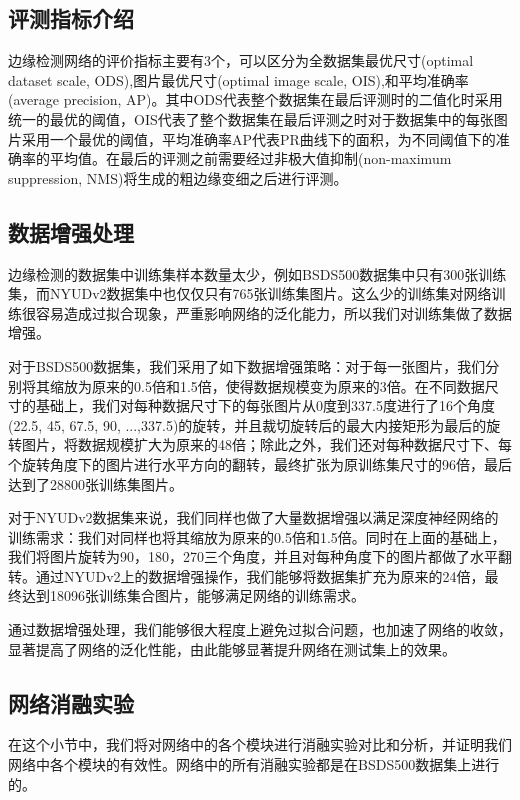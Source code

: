 \documentclass[master]{thesis-uestc}
\begin{document}
{\subsection{评测指标介绍}
边缘检测网络的评价指标主要有3个，可以区分为全数据集最优尺寸(optimal dataset scale, ODS),图片最优尺寸(optimal image scale, OIS),和平均准确率(average precision, AP)。其中ODS代表整个数据集在最后评测时的二值化时采用统一的最优的阈值，OIS代表了整个数据集在最后评测之时对于数据集中的每张图片采用一个最优的阈值，平均准确率AP代表PR曲线下的面积，为不同阈值下的准确率的平均值。在最后的评测之前需要经过非极大值抑制(non-maximum suppression, NMS)将生成的粗边缘变细之后进行评测。

\subsection{数据增强处理}
边缘检测的数据集中训练集样本数量太少，例如BSDS500数据集中只有300张训练集，而NYUDv2数据集中也仅仅只有765张训练集图片。这么少的训练集对网络训练很容易造成过拟合现象，严重影响网络的泛化能力，所以我们对训练集做了数据增强。

对于BSDS500数据集，我们采用了如下数据增强策略：对于每一张图片，我们分别将其缩放为原来的0.5倍和1.5倍，使得数据规模变为原来的3倍。在不同数据尺寸的基础上，我们对每种数据尺寸下的每张图片从0度到337.5度进行了16个角度(22.5, 45, 67.5, 90, ...,337.5)的旋转，并且裁切旋转后的最大内接矩形为最后的旋转图片，将数据规模扩大为原来的48倍；除此之外，我们还对每种数据尺寸下、每个旋转角度下的图片进行水平方向的翻转，最终扩张为原训练集尺寸的96倍，最后达到了28800张训练集图片。

对于NYUDv2数据集来说，我们同样也做了大量数据增强以满足深度神经网络的训练需求：我们对同样也将其缩放为原来的0.5倍和1.5倍。同时在上面的基础上，我们将图片旋转为90，180，270三个角度，并且对每种角度下的图片都做了水平翻转。通过NYUDv2上的数据增强操作，我们能够将数据集扩充为原来的24倍，最终达到18096张训练集合图片，能够满足网络的训练需求。

通过数据增强处理，我们能够很大程度上避免过拟合问题，也加速了网络的收敛，显著提高了网络的泛化性能，由此能够显著提升网络在测试集上的效果。
\subsection{网络消融实验}
在这个小节中，我们将对网络中的各个模块进行消融实验对比和分析，并证明我们网络中各个模块的有效性。网络中的所有消融实验都是在BSDS500数据集上进行的。

}
\end{document}
